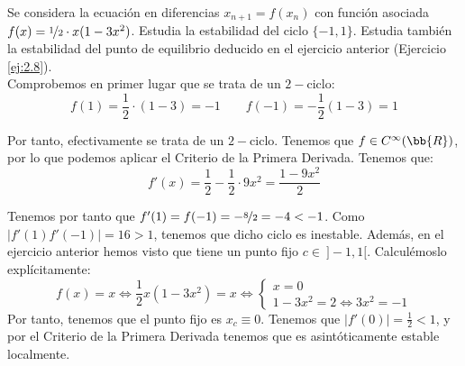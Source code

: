 \begin{ejercicio}
    Se considera la ecuación en diferencias $x_{n+1} = f(x_n)$ con función asociada $f(x) = \nicefrac{1}{2}\cdot x(1 - 3x^2)$. Estudia la estabilidad del ciclo $\{-1, 1\}$. Estudia también la estabilidad del punto de equilibrio deducido en el ejercicio anterior (Ejercicio \ref{ej:2.8}).\\

    Comprobemos en primer lugar que se trata de un $2-$ciclo:
    \begin{equation*}
        f(1)=\frac{1}{2}\cdot (1-3) = -1 \qquad f(-1)=-\frac{1}{2}(1-3) = 1
    \end{equation*}
    
    Por tanto, efectivamente se trata de un $2-$ciclo. Tenemos que $f\in C^\infty(\bb{R})$, por lo que podemos aplicar el Criterio de la Primera Derivada. Tenemos que:
    \begin{equation*}
        f'(x)=\frac{1}{2}-\frac{1}{2}\cdot 9x^2 = \frac{1-9x^2}{2}
    \end{equation*}

    Tenemos por tanto que $f'(1)=f(-1)=-\nicefrac{8}{2}=-4<-1$. Como $|f'(1)f'(-1)|=16>1$, tenemos que dicho ciclo es inestable. Además, en el ejercicio anterior hemos visto que tiene un punto fijo $c\in ~]-1,1[$. Calculémoslo explícitamente:
    \begin{equation*}
        f(x)=x \Longleftrightarrow \frac{1}{2}x(1-3x^2)=x \Longleftrightarrow
        \left\{\begin{array}{c}
            x = 0\\
            1-3x^2 = 2 \Longleftrightarrow 3x^2 = -1
        \end{array}\right.
    \end{equation*}
    Por tanto, tenemos que el punto fijo es $x_c\equiv 0$. Tenemos que $|f'(0)|=\frac{1}{2}<1$, y por el Criterio de la Primera Derivada tenemos que es asintóticamente estable localmente.


\end{ejercicio}
